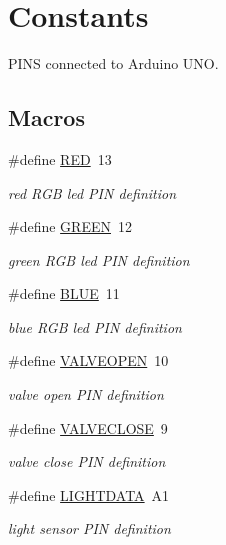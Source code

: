 \hypertarget{group__const}{}\section{Constants}
\label{group__const}


P\+I\+NS connected to Arduino U\+NO.  


\subsection*{Macros}
\begin{DoxyCompactItemize}
\item 
\#define \hyperlink{group__const_ga8d23feea868a983c8c2b661e1e16972f}{R\+ED}~13
\begin{DoxyCompactList}\small\item\em red R\+GB led P\+IN definition \end{DoxyCompactList}\item 
\#define \hyperlink{group__const_gacfbc006ea433ad708fdee3e82996e721}{G\+R\+E\+EN}~12
\begin{DoxyCompactList}\small\item\em green R\+GB led P\+IN definition \end{DoxyCompactList}\item 
\#define \hyperlink{group__const_ga79d10e672abb49ad63eeaa8aaef57c38}{B\+L\+UE}~11
\begin{DoxyCompactList}\small\item\em blue R\+GB led P\+IN definition \end{DoxyCompactList}\item 
\#define \hyperlink{group__const_ga01d9e55721bcb62fc43ce6590381e7a1}{V\+A\+L\+V\+E\+O\+P\+EN}~10
\begin{DoxyCompactList}\small\item\em valve open P\+IN definition \end{DoxyCompactList}\item 
\#define \hyperlink{group__const_ga62c161c7c128e6b536eb24b11d79ee1a}{V\+A\+L\+V\+E\+C\+L\+O\+SE}~9
\begin{DoxyCompactList}\small\item\em valve close P\+IN definition \end{DoxyCompactList}\item 
\#define \hyperlink{group__const_gac227510232a444c14db6b7a8a4533c76}{L\+I\+G\+H\+T\+D\+A\+TA}~A1
\begin{DoxyCompactList}\small\item\em light sensor P\+IN definition \end{DoxyCompactList}\item 

\end{DoxyCompactItemize}
